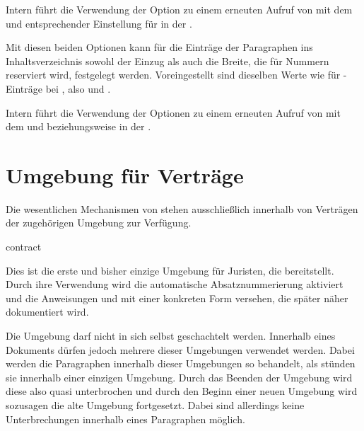 Intern führt die Verwendung der Option zu
einem erneuten Aufruf von
mit dem   und entsprechender Einstellung für
 in der .%
\EndIndexGroup


\begin{Declaration}
\end{Declaration}
Mit diesen beiden Optionen kann für die Einträge der Paragraphen ins
Inhaltsverzeichnis sowohl der Einzug als auch die Breite, die für Nummern
reserviert wird, festgelegt werden. Voreingestellt
sind dieselben Werte wie für
-Einträge%
 bei , also
 und .

Intern führt die Verwendung der Optionen
zu einem erneuten Aufruf von
 mit
dem   und 
beziehungsweise  in der
.%
\EndIndexGroup


\section{Umgebung für Verträge}

\BeginIndexGroup
{}
Die wesentlichen Mechanismen von  stehen ausschließlich
innerhalb von Verträgen der zugehörigen Umgebung zur Verfügung.

\begin{Declaration}
  \begin{Environment}{contract}\end{Environment}
\end{Declaration}
Dies ist die erste und bisher einzige Umgebung für Juristen, die
 bereitstellt. Durch ihre Verwendung wird die automatische
Absatznummerierung aktiviert und die Anweisungen
 und  mit
einer konkreten Form versehen, die später näher dokumentiert wird.

Die Umgebung  darf nicht in sich
selbst geschachtelt werden. Innerhalb eines Dokuments dürfen jedoch mehrere
dieser Umgebungen verwendet werden. Dabei werden die Paragraphen innerhalb
dieser Umgebungen so behandelt, als stünden sie innerhalb einer einzigen
Umgebung. Durch das Beenden der Umgebung wird diese also quasi
unterbrochen und durch den Beginn einer neuen Umgebung wird sozusagen die alte
Umgebung fortgesetzt. Dabei sind allerdings keine Unterbrechungen innerhalb
eines Paragraphen möglich.

